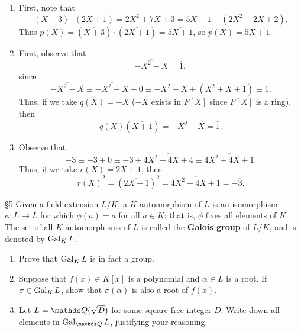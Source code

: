 \documentclass{homework}
\begin{document}
\begin{solution}
  \begin{enumerate}[label=(\alph*)]
    \item First, note that \[
        (X+3)\cdot (2X+1)=2X^2+7X+3=5X+1+(2X^2+2X+2)
      .\] Thus $\overline{p(X)}=(\overline{X+3})\cdot (\overline{2X+1})=\overline{5X+1}$, so
      $p(X)=5X+1$.
    \item First, observe that \[
        \overline{-X^2-X}=\overline{1}
      ,\] since \[
        \overline{-X^2-X}\equiv \overline{-X^2-X}+\overline{0}\equiv-X^2-X+(X^2+X+1) \equiv \overline{1}
      .\] Thus, if we take $q(X)=-X$ ($-X$ exists in $F[X]$ since $F[X]$ is a ring), then \[
        \overline{q(X)}(\overline{X+1})=\overline{-X^2-X}=\overline{1}
      .\] 
    \item Observe that \[
        -\overline{3}\equiv-\overline{3}+\overline{0}\equiv-\overline{3}+\overline{4X^2+4X+4}\equiv
        \overline{4X^2+4X+1}
      .\] Thus, if we take $r(X)=2X+1$, then \[
        \overline{r(X)}^2=(\overline{2X+1})^2=\overline{4X^2+4X+1}=-\overline{3}
      .\] 
  \end{enumerate}
\end{solution}

\begin{problem}{\S 5}
  Given a field extension $L / K$, a $K$-automorphism of $L$ is an isomorphism $\phi:L\to L$ for
  which $\phi(a)=a$ for all $a\in K$; that is, $\phi$ fixes all elements of $K$. The set of all
  $K$-automorphisms of $L$ is called the \textbf{Galois group} of $L / K$, and is denoted by
  $\operatorname{Gal}_KL$.
  \begin{enumerate}[label=(\alph*)]
    \item Prove that $\operatorname{Gal}_KL$ is in fact a group.
    \item Suppose that $f(x)\in K[x]$ is a polynomial and $\alpha\in L$ is a root. If $\sigma\in
      \operatorname{Gal}_KL$, show that $\sigma(\alpha)$ is also a root of $f(x)$.
    \item Let $L=\Q(\sqrt{D})$ for some square-free integer $D$. Write down all elements in
      $\Gal_{\Q}L$, justifying your reasoning.
  \end{enumerate}
\end{problem}
\end{document}
